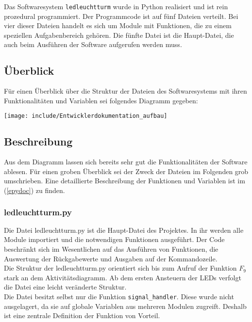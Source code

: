 Das Softwaresystem \texttt{ledleuchtturm} wurde in Python realisiert und ist rein prozedural programmiert. Der Programmcode ist auf fünf Dateien verteilt. Bei vier dieser Dateien handelt es sich um Module mit Funktionen, die zu einem speziellen Aufgabenbereich gehören. Die fünfte Datei ist die Haupt-Datei, die auch beim Ausführen der Software aufgerufen werden muss.

\subsection{Überblick}
Für einen Überblick über die Struktur der Dateien des Softwaresystems mit ihren Funktionalitäten und Variablen sei folgendes Diagramm gegeben:
\begin{center}
	\texttt{[image: include/Entwicklerdokumentation\_aufbau]}
\end{center}

\subsection{Beschreibung}
Aus dem Diagramm lassen sich bereits sehr gut die Funktionalitäten der Software ablesen. Für einen groben Überblick sei der Zweck der Dateien im Folgenden grob umschrieben. Eine detaillierte Beschreibung der Funktionen und Variablen ist im  (\autoref{epydoc}) zu finden.

\subsubsection*{ledleuchtturm.py}
Die Datei ledleuchtturm.py ist die Haupt-Datei des Projektes. In ihr werden alle Module importiert und die notwendigen Funktionen ausgeführt. Der Code beschränkt sich im Wesentlichen auf das Ausführen von Funktionen, die Auswertung der Rückgabewerte und Ausgaben auf der Kommandozeile.\\
Die Struktur der ledleuchtturm.py orientiert sich bis zum Aufruf der Funktion $F_9$ stark an dem Aktivitätsdiagramm. Ab dem ersten Ansteuern der LEDs verfolgt die Datei eine leicht veränderte Struktur.\\
Die Datei besitzt selbst nur die Funktion \texttt{signal\_handler}. Diese  wurde nicht ausgelagert, da sie auf globale Variablen aus mehreren Modulen zugreift. Deshalb ist eine zentrale Definition der Funktion von Vorteil.

